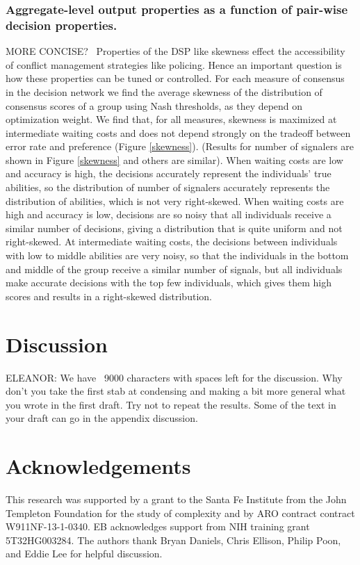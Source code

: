\documentclass{article}
\begin{document}
\subsubsection*{Aggregate-level output properties as a function of pair-wise decision properties. }
MORE CONCISE?
\ Properties of the DSP like skewness effect the accessibility of conflict management strategies like policing. Hence an important question is how these properties can be tuned or controlled. For each measure of consensus in the decision network we find the average skewness of the distribution of consensus scores of a group using Nash thresholds, as they depend on optimization weight. We find that, for all measures, skewness is maximized at intermediate waiting costs and does not depend strongly on the tradeoff between error rate and preference (Figure \ref{skewness}). (Results for number of signalers are shown in Figure \ref{skewness} and others are similar).  When waiting costs are low and accuracy is high, the decisions accurately represent the individuals' true  abilities, so the distribution of number of signalers accurately represents the distribution of abilities, which is not very right-skewed.  When waiting costs are high and accuracy is low, decisions are so noisy that all individuals receive a similar number of decisions, giving a distribution that is quite uniform and not right-skewed.  At intermediate waiting costs, the decisions between individuals with low to middle abilities are very noisy, so that the individuals in the bottom and middle of the group receive a similar number of signals, but all individuals make accurate decisions with the top few individuals, which gives them high scores and results in a right-skewed distribution.

\section*{Discussion}
ELEANOR: We have ~9000 characters with spaces left for the discussion. Why don't you take the first stab at condensing and making a bit more general what you wrote in the first draft. Try not to repeat the results. Some of the text in your draft can go in the appendix discussion. 

\section*{Acknowledgements }
This research was supported by a grant to the Santa Fe Institute from the John Templeton Foundation for the study of complexity and by ARO contract contract W911NF-13-1-0340. EB acknowledges support from NIH training grant 5T32HG003284. The authors thank Bryan Daniels, Chris Ellison, Philip Poon, and Eddie Lee for helpful discussion. 
\end{document}
